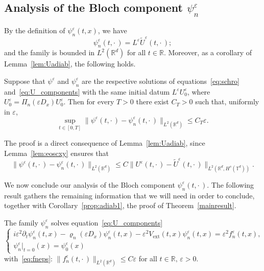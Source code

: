 \documentclass[AHL,Unicode,longabstracts]{cedram}
\DeclareMathOperator{\ext}{ext}
\newcommand*\R{{\mathbb R}}
\newcommand*\T{{\mathbb T}}
\newcommand*\eps{\varepsilon}
\numberwithin{equation}{section}
\begin{document}
\subsection{Analysis of the Bloch component \texorpdfstring{$\psi^\eps_n$}{psi epsn}}\label{sec:psiepsn}

By the definition of $\psi^\eps_n(t,x)$, we have
\[
\psi^\eps_n(t,\cdot\,)= L^\eps \widetilde U^\eps(t,\cdot\,);
\]
and the family is bounded in $L^2(\R^d)$ for all $t\in\R$. Moreover, as a corollary of Lemma~\ref{lem:Uadiab}, the following holds.

\begin{coro}\label{prop:adiab1}
Suppose that $\psi^\eps$ and $\psi^\eps_n$ are the respective solutions of equations~\eqref{eq:schro} and~\eqref{eq:U_components} with the same initial datum $L^\eps U^\eps_0$, where $U^\eps_0= \Pi_n(\eps D_x) U^\eps_0$. Then for every $T>0$ there exist $C_T>0$ such that, uniformly in $\eps$,
\begin{equation*}
\sup_{t\in[0,T]} \| \psi^\eps(t,\cdot\,)- \psi^\eps_n(t,\cdot\,)\|_{L^2(\R^d)} \leq C_{T}\eps.
\end{equation*}
\end{coro}

The proof is a direct consequence of Lemma~\ref{lem:Uadiab}, since Lemma~\ref{lem:eoscxy} ensures that
\[
\| \psi^\eps(t,\cdot\,)- \psi^\eps_n(t,\cdot\,)\|_{L^2(\R^d)} \leq C \| U^\eps(t,\cdot\,)-\widetilde U^\eps(t,\cdot\,)\|_{L^2(\R^d,H^s(\T^d))}.
\]

We now conclude our analysis of the Bloch component $\psi^\eps_n(t,\cdot\,)$. The following result gathers the remaining information that we will need in order to conclude, together with Corollary~\ref{prop:adiab1}, the proof of Theorem~\ref{mainresult}.

\begin{prop}\label{lem:decompsolution}
The family $\psi_n^\eps$ solves equation~\eqref{eq:U_components}
\[
\begin{cases}
i\eps^2 \partial_{t} \psi^\eps_{n} (t,x)- \varrho_{n}(\eps D_x) \psi^\eps_{n}(t,x)- \eps^2 V_{\ext}(t,x) \psi^\eps_{n}(t,x)= \eps^2 f^\eps_n(t,x),\\
\psi^\eps_{n}|_{t=0}(x)= \psi_{0}^{\eps}(x)
\end{cases}
\]
with~\eqref{eq:fneps}: $\|f^\eps_n(t,\cdot\,)\|_{L^2(\R^d)}\leq C\eps$ for all $t\in\R,\,\eps>0.$
\end{prop}
\end{document}
